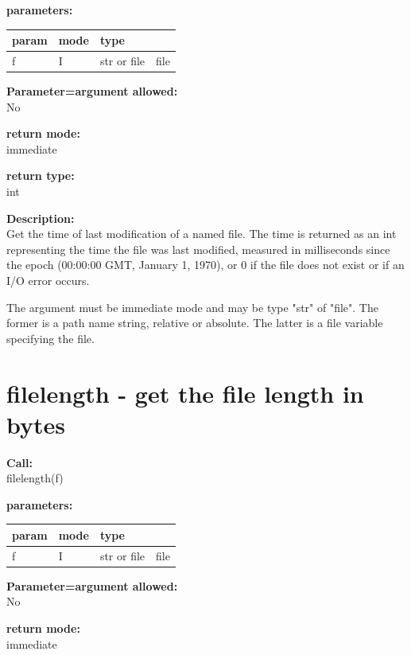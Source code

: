         {\bf parameters:} \\
        \begin{tabular}{| l | l | l | l |}
        \hline
        param  & mode & type & \\
        \hline \hline
        f & I & str or file & file \\ \hline
        \end{tabular}
        
        {\bf Parameter=argument allowed:} \\
        No
        
        {\bf return mode:} \\
        immediate

        {\bf return type:} \\
        int
        
        {\bf Description:} \\
        Get the time of last modification of a named file. The time
        is returned as an int representing the time the file was last
        modified, measured in milliseconds since the epoch (00:00:00 GMT,
        January 1, 1970), or 0 if the file does not exist or if an I/O
        error occurs.
        
        The argument must be immediate mode and may be type "str"
        of "file". The former is a path name string, relative or absolute.
        The latter is a file variable specifying the file.
 


    \section{filelength - get the file length in bytes}\label{sec:iffilelength}
        
        {\bf Call:} \\
        filelength(f)
        
        {\bf parameters:} \\
        \begin{tabular}{| l | l | l | l |}
        \hline
        param  & mode & type & \\
        \hline \hline
        f & I & str or file & file \\ \hline
        \end{tabular}
        
        {\bf Parameter=argument allowed:} \\
        No
        
        {\bf return mode:} \\
        immediate

